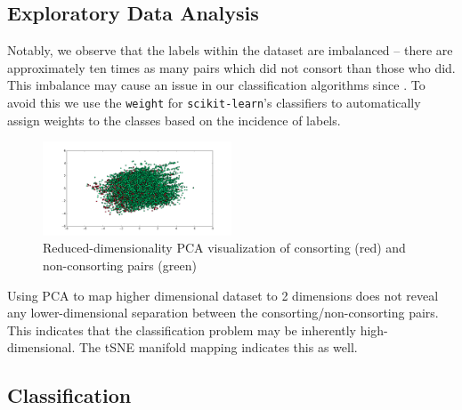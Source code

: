 \documentclass[twoside,twocolumn,paper=letter]{article}
\begin{document}
\subsection{Exploratory Data Analysis}
Notably, we observe that the labels within the dataset are imbalanced -- there
are approximately ten times as many pairs which did not consort than those who
did. This imbalance may cause an issue in our classification algorithms since .
To avoid this we use the \texttt{weight} for \texttt{scikit-learn}'s classifiers
to automatically assign weights to the classes based on the incidence of labels.
\begin{figure}
      \centering
          \includegraphics[width=0.5\textwidth]{../figs/consort_non_consort_visualization_pca.png}
  \caption{Reduced-dimensionality PCA visualization of consorting (red) and
  non-consorting pairs (green)}
\end{figure}
Using PCA to map higher dimensional dataset to 2 dimensions does not reveal
any lower-dimensional separation between the consorting/non-consorting pairs.
This indicates that the classification problem may be inherently
high-dimensional. The tSNE manifold mapping indicates this as well.
\subsection{Classification}
\end{document}
